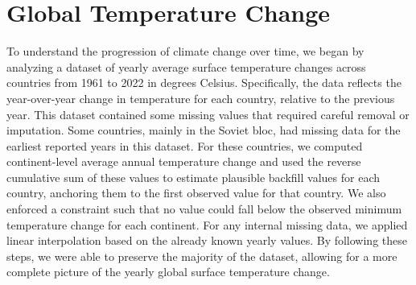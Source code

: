 \documentclass[10pt]{article}
\begin{document}
\section{Global Temperature Change}  
\label{TempChange}
To understand the progression of climate change over time, we began by analyzing a dataset of yearly average surface temperature changes across countries from 1961 to 2022 in degrees Celsius. Specifically, the data reflects the year-over-year change in temperature for each country, relative to the previous year. This dataset contained some missing values that required careful removal or imputation. Some countries, mainly in the Soviet bloc, had missing data for the earliest reported years in this dataset. For these countries, we computed continent-level average annual temperature change and used the reverse cumulative sum of these values to estimate plausible backfill values for each country, anchoring them to the first observed value for that country. We also enforced a constraint such that no value could fall below the observed minimum temperature change for each continent. For any internal missing data, we applied linear interpolation based on the already known yearly values. By following these steps, we were able to preserve the majority of the dataset, allowing for a more complete picture of the yearly global surface temperature change. 
\end{document}
